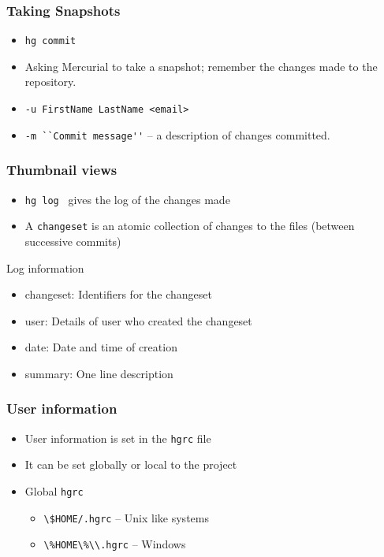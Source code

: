 \documentclass[14pt,compress]{beamer}
\newcounter{time}
\newcommand{\typ}[1]{\lstinline{#1}}
\begin{document}
\begin{frame}
  \frametitle{Taking Snapshots}
  \begin{itemize}
  \item \typ{hg commit}
  \item Asking Mercurial to take a snapshot; remember the changes made
    to the repository. 
  \item \typ{-u FirstName LastName <email>}
  \item \typ{-m ``Commit message''} -- a description of changes committed. 
  \end{itemize}
\end{frame}

\begin{frame}
  \frametitle{Thumbnail views}
  \begin{itemize}
  \item \typ{hg log}~ gives the log of the changes made
  \item A \typ{changeset} is an atomic collection of changes to the
    files (between successive commits)
  \end{itemize}
  \begin{block}{Log information}
    \begin{itemize}
    \item \alert{changeset}: Identifiers for the changeset
    \item \alert{user}: Details of user who created the changeset
    \item \alert{date}: Date and time of creation
    \item \alert{summary}: One line description
    \end{itemize}    
  \end{block}
\end{frame}

\begin{frame}
  \frametitle{User information}
  \begin{itemize}
  \item User information is set in the \typ{hgrc} file
  \item It can be set globally or local to the project
  \item Global \typ{hgrc}
    \begin{itemize}
    \item \typ{\$HOME/.hgrc} -- Unix like systems
    \item \typ{\%HOME\%\\.hgrc} -- Windows
    \end{itemize}
  \end{itemize}
\end{frame}
\end{document}
